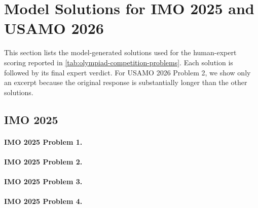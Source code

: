 \section{Model Solutions for IMO 2025 and USAMO 2026}
\label{app:olympiad-solutions}
This section lists the model-generated solutions used for the human-expert scoring reported in \cref{tab:olympiad-competition-problems}. Each solution is followed by its final expert verdict. For USAMO 2026 Problem 2, we show only an excerpt because the original response is substantially longer than the other solutions.

\begingroup
\footnotesize
\sloppy
\setlength{\parindent}{0pt}
\setlength{\parskip}{0.08em}
\setlength{\abovedisplayskip}{3pt}
\setlength{\belowdisplayskip}{3pt}
\setlength{\abovedisplayshortskip}{2pt}
\setlength{\belowdisplayshortskip}{2pt}
\newcommand{\solutionheading}[1]{\par\smallskip\noindent\textbf{#1}\par}
\newcommand{\compactbullet}[1]{\par\noindent$\triangleright$~#1\par}
\newcommand{\compactnumber}[2]{\par\noindent\textbf{#1.}~#2\par}

\subsection{IMO 2025}
\vspace{1em}
\paragraph{IMO 2025 Problem 1.}


\paragraph{IMO 2025 Problem 2.}


\paragraph{IMO 2025 Problem 3.}


\paragraph{IMO 2025 Problem 4.}


